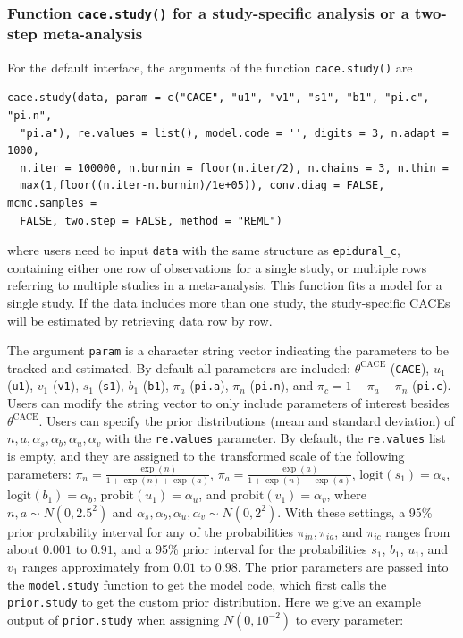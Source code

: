 \hypertarget{function-cace.study-for-a-study-specific-analysis-or-a-two-step-meta-analysis}{%
\subsubsection{\texorpdfstring{Function \texttt{cace.study()} for a study-specific analysis or a two-step meta-analysis}{Function cace.study() for a study-specific analysis or a two-step meta-analysis}}\label{function-cace.study-for-a-study-specific-analysis-or-a-two-step-meta-analysis}}

For the default interface, the arguments of the function \texttt{cace.study()} are

\begin{verbatim}
cace.study(data, param = c("CACE", "u1", "v1", "s1", "b1", "pi.c", "pi.n", 
  "pi.a"), re.values = list(), model.code = '', digits = 3, n.adapt = 1000, 
  n.iter = 100000, n.burnin = floor(n.iter/2), n.chains = 3, n.thin =  
  max(1,floor((n.iter-n.burnin)/1e+05)), conv.diag = FALSE, mcmc.samples =
  FALSE, two.step = FALSE, method = "REML")
\end{verbatim}

where users need to input \texttt{data} with the same structure as \texttt{epidural\_c}, containing either one row of observations for a single study, or multiple rows referring to multiple studies in a meta-analysis. This function fits a model for a single study. If the data includes more than one study, the study-specific CACEs will be estimated by retrieving data row by row.

The argument \texttt{param} is a character string vector indicating the parameters to be tracked and estimated. By default all parameters are included: \(\theta^\text{CACE}\) (\texttt{CACE}), \(u_1\) (\texttt{u1}), \(v_1\) (\texttt{v1}), \(s_1\) (\texttt{s1}), \(b_1\) (\texttt{b1}), \(\pi_a\) (\texttt{pi.a}), \(\pi_n\) (\texttt{pi.n}), and \(\pi_c=1-\pi_a-\pi_n\) (\texttt{pi.c}). Users can modify the string vector to only include parameters of interest besides \(\theta^\text{CACE}\).
Users can specify the prior distributions (mean and standard deviation) of \(n, a, \alpha_s, \alpha_b, \alpha_u, \alpha_v\) with the \texttt{re.values} parameter. By default, the \texttt{re.values} list is empty, and they are assigned to the transformed scale of the following parameters:
\(\pi_{n}=\frac{\exp(n)}{1+\exp(n)+\exp(a)}\), \(\pi_{a}=\frac{\exp(a)}{1+\exp(n)+\exp(a)}\), \(\text{logit}(s_{1})=\alpha_s\), \(\text{logit}(b_{1})=\alpha_b\), \(\text{probit}(u_{1})=\alpha_u\), and \(\text{probit}(v_{1})=\alpha_v\), where \(n, a \sim N(0, 2.5^2)\) and \(\alpha_s, \alpha_b, \alpha_u, \alpha_v \sim N(0, 2^2)\). With these settings, a 95\% prior probability interval for any of the probabilities \(\pi_{in}, \pi_{ia}\), and \(\pi_{ic}\) ranges from about \(0.001\) to \(0.91\), and a 95\% prior interval for the probabilities \(s_1\), \(b_1\), \(u_1\), and \(v_1\) ranges approximately from \(0.01\) to \(0.98\).
The prior parameters are passed into the \texttt{model.study} function to get the model code, which first calls the \texttt{prior.study} to get the custom prior distribution.
Here we give an example output of \texttt{prior.study} when assigning \(N(0, 10^{-2})\) to every parameter:

